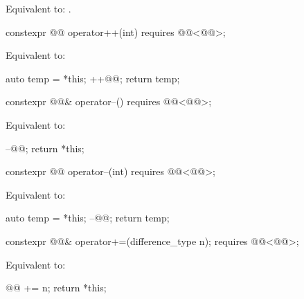 \begin{itemdescr}
\pnum
\effects
Equivalent to: .
\end{itemdescr}

%
\begin{itemdecl}
constexpr @@ operator++(int) requires @@<@@>;
\end{itemdecl}

\begin{itemdescr}
\pnum
\effects
Equivalent to:
\begin{codeblock}
auto temp = *this;
++@@;
return temp;
\end{codeblock}
\end{itemdescr}

%
\begin{itemdecl}
constexpr @@& operator--() requires @@<@@>;
\end{itemdecl}

\begin{itemdescr}
\pnum
\effects
Equivalent to:
\begin{codeblock}
--@@;
return *this;
\end{codeblock}
\end{itemdescr}

%
\begin{itemdecl}
constexpr @@ operator--(int) requires @@<@@>;
\end{itemdecl}

\begin{itemdescr}
\pnum
\effects
Equivalent to:
\begin{codeblock}
auto temp = *this;
--@@;
return temp;
\end{codeblock}
\end{itemdescr}

%
\begin{itemdecl}
constexpr @@& operator+=(difference_type n);
  requires @@<@@>;
\end{itemdecl}

\begin{itemdescr}
\pnum
\effects
Equivalent to:
\begin{codeblock}
@@ += n;
return *this;
\end{codeblock}
\end{itemdescr}

